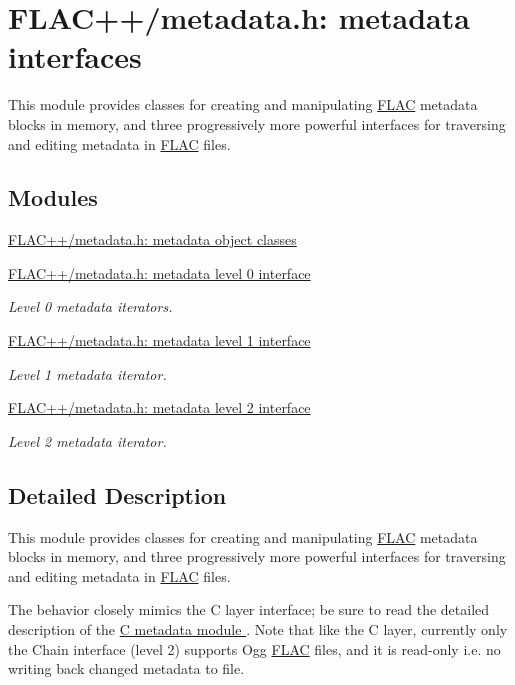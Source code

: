 \hypertarget{group__flacpp__metadata}{}\section{F\+L\+A\+C++/metadata.h\+: metadata interfaces}
\label{group__flacpp__metadata}


This module provides classes for creating and manipulating \hyperlink{namespace_f_l_a_c}{F\+L\+AC} metadata blocks in memory, and three progressively more powerful interfaces for traversing and editing metadata in \hyperlink{namespace_f_l_a_c}{F\+L\+AC} files.  


\subsection*{Modules}
\begin{DoxyCompactItemize}
\item 
\hyperlink{group__flacpp__metadata__object}{F\+L\+A\+C++/metadata.\+h\+: metadata object classes}
\item 
\hyperlink{group__flacpp__metadata__level0}{F\+L\+A\+C++/metadata.\+h\+: metadata level 0 interface}
\begin{DoxyCompactList}\small\item\em Level 0 metadata iterators. \end{DoxyCompactList}\item 
\hyperlink{group__flacpp__metadata__level1}{F\+L\+A\+C++/metadata.\+h\+: metadata level 1 interface}
\begin{DoxyCompactList}\small\item\em Level 1 metadata iterator. \end{DoxyCompactList}\item 
\hyperlink{group__flacpp__metadata__level2}{F\+L\+A\+C++/metadata.\+h\+: metadata level 2 interface}
\begin{DoxyCompactList}\small\item\em Level 2 metadata iterator. \end{DoxyCompactList}\end{DoxyCompactItemize}


\subsection{Detailed Description}
This module provides classes for creating and manipulating \hyperlink{namespace_f_l_a_c}{F\+L\+AC} metadata blocks in memory, and three progressively more powerful interfaces for traversing and editing metadata in \hyperlink{namespace_f_l_a_c}{F\+L\+AC} files. 

The behavior closely mimics the C layer interface; be sure to read the detailed description of the \hyperlink{group__flac__metadata}{C metadata module }. Note that like the C layer, currently only the Chain interface (level 2) supports Ogg \hyperlink{namespace_f_l_a_c}{F\+L\+AC} files, and it is read-\/only i.\+e. no writing back changed metadata to file. 